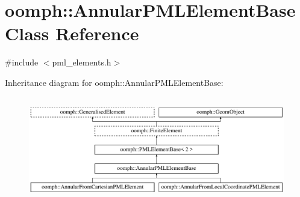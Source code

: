 \hypertarget{classoomph_1_1AnnularPMLElementBase}{}\section{oomph\+:\+:Annular\+P\+M\+L\+Element\+Base Class Reference}
\label{classoomph_1_1AnnularPMLElementBase}


{\ttfamily \#include $<$pml\+\_\+elements.\+h$>$}

Inheritance diagram for oomph\+:\+:Annular\+P\+M\+L\+Element\+Base\+:\begin{figure}[H]
\begin{center}
\leavevmode
\includegraphics[height=4.666667cm]{classoomph_1_1AnnularPMLElementBase}
\end{center}
\end{figure}
